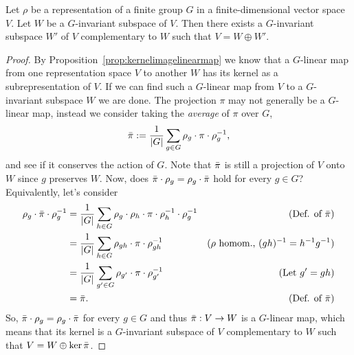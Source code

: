 {\allowdisplaybreaks\begin{proposition}\label{prop:complsubrepr}
	Let $\rho$ be a representation of a finite group $G$ in a finite-dimensional vector space $V$. Let $W$ be a $G$-invariant subspace of $V$. Then there exists a $G$-invariant subspace $W'$ of $V$ complementary to $W$ such that $V = W \oplus W'$.
\end{proposition}
\begin{proof}
	By Proposition~\ref{prop:kernelimagelinearmap} we know that a $G$-linear map from one representation space $V$ to another $W$ has its kernel as a subrepresentation of $V$. If we can find such a $G$-linear map from $V$ to a $G$-invariant subspace $W$ we are done.
	The projection $\pi$ may not generally be a $G$-linear map, instead we consider taking the \textit{average} of $\pi$ over $G$,
	\begin{align*}
		\bar{\pi} := \frac{1}{|G|} \sum_{g \in G} \rho_g \cdot \pi \cdot \rho_g^{-1},
	\end{align*}
	and see if it conserves the action of $G$. Note that $\bar{\pi}$ is still a projection of $V$ onto $W$ since $g$ preserves $W$. Now, does $\bar{\pi}\cdot \rho_g = \rho_g \cdot \bar{\pi}$ hold for every $g \in G$? Equivalently, let's consider
	\begin{align*}
		\rho_g \cdot \bar{\pi} \cdot \rho_g^{-1} &= \frac{1}{|G|} \sum_{h \in G} \rho_g \cdot \rho_h \cdot \pi \cdot \rho_h^{-1} \cdot \rho_g^{-1} & \text{(Def. of $\bar{\pi}$)}\\
		&= \frac{1}{|G|} \sum_{h \in G} \rho_{gh} \cdot \pi \cdot \rho_{gh}^{-1} & \text{($\rho$ homom., $(gh)^{-1}=h^{-1}g^{-1}$)}\\
		&= \frac{1}{|G|} \sum_{g' \in G} \rho_{g'} \cdot \pi \cdot \rho_{g'}^{-1} & \text{(Let $g' = gh$)} \\
		&= \bar{\pi}. & \text{(Def. of $\bar{\pi}$)}
	\end{align*}
	So, $\bar{\pi} \cdot \rho_g = \rho_g \cdot \bar{\pi}$ for every $g \in G$ and thus $\bar{\pi}: V \rightarrow W$ is a $G$-linear map, which means that its kernel is a $G$-invariant subspace of $V$ complementary to $W$ such that $V = W \oplus \ker \bar{\pi}$.%
\end{proof}}

